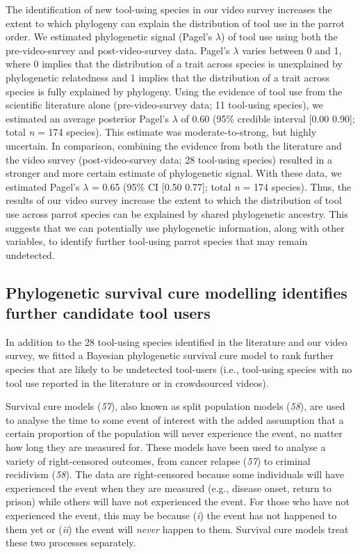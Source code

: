 \documentclass[
  man,floatsintext]{apa6}
\begin{document}
The identification of new tool-using species in our video survey increases the
extent to which phylogeny can explain the distribution of tool use in the parrot
order. We estimated phylogenetic signal (Pagel's \(\lambda\)) of tool use using
both the pre-video-survey and post-video-survey data. Pagel's \(\lambda\) varies
between 0 and 1, where 0 implies that the distribution of a trait across species
is unexplained by phylogenetic relatedness and 1 implies that the distribution
of a trait across species is fully explained by phylogeny. Using the evidence of
tool use from the scientific literature alone (pre-video-survey data; 11
tool-using species), we estimated an average posterior Pagel's \(\lambda\) of
0.60 (95\% credible interval {[}0.00
0.90{]}; total \emph{n} =
174 species). This estimate was moderate-to-strong, but highly
uncertain. In comparison, combining the evidence from both the literature and
the video survey (post-video-survey data; 28 tool-using species) resulted in a
stronger and more certain estimate of phylogenetic signal. With these data, we
estimated Pagel's \(\lambda\) = 0.65 (95\% CI
{[}0.50
0.77{]}; total \emph{n} =
174 species). Thus, the results of our video survey increase
the extent to which the distribution of tool use across parrot species can be
explained by shared phylogenetic ancestry. This suggests that we can potentially
use phylogenetic information, along with other variables, to identify further
tool-using parrot species that may remain undetected.

\hypertarget{phylogenetic-survival-cure-modelling-identifies-further-candidate-tool-users}{%
\subsection{Phylogenetic survival cure modelling identifies further candidate tool users}\label{phylogenetic-survival-cure-modelling-identifies-further-candidate-tool-users}}

In addition to the 28 tool-using species identified in the literature and our
video survey, we fitted a Bayesian phylogenetic survival cure model to rank
further species that are likely to be undetected tool-users (i.e., tool-using
species with no tool use reported in the literature or in crowdsourced videos).

Survival cure models (\emph{57}), also known as split population
models (\emph{58}), are used to analyse the time to some event of interest
with the added assumption that a certain proportion of the population will never
experience the event, no matter how long they are measured for. These models
have been used to analyse a variety of right-censored outcomes, from cancer
relapse (\emph{57}) to criminal recidivism (\emph{58}). The data are
right-censored because some individuals will have experienced the event when
they are measured (e.g., disease onset, return to prison) while others will have
not experienced the event. For those who have not experienced the event, this
may be because (\emph{i}) the event has not happened to them yet or (\emph{ii}) the event
will \emph{never} happen to them. Survival cure models treat these two processes
separately.
\end{document}
